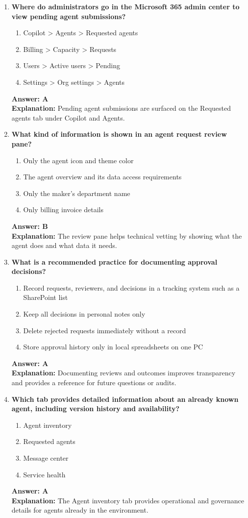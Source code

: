 \documentclass[10pt]{article}
\begin{document}
\begin{enumerate}[leftmargin=*]
\item \textbf{Where do administrators go in the Microsoft 365 admin center to view pending agent submissions?}
\begin{enumerate}[label=\Alph*.]
  \item Copilot > Agents > Requested agents
  \item Billing > Capacity > Requests
  \item Users > Active users > Pending
  \item Settings > Org settings > Agents
\end{enumerate}
\textbf{Answer: A}\\
\textbf{Explanation:} Pending agent submissions are surfaced on the Requested agents tab under Copilot and Agents.

\item \textbf{What kind of information is shown in an agent request review pane?}
\begin{enumerate}[label=\Alph*.]
  \item Only the agent icon and theme color
  \item The agent overview and its data access requirements
  \item Only the maker's department name
  \item Only billing invoice details
\end{enumerate}
\textbf{Answer: B}\\
\textbf{Explanation:} The review pane helps technical vetting by showing what the agent does and what data it needs.

\item \textbf{What is a recommended practice for documenting approval decisions?}
\begin{enumerate}[label=\Alph*.]
  \item Record requests, reviewers, and decisions in a tracking system such as a SharePoint list
  \item Keep all decisions in personal notes only
  \item Delete rejected requests immediately without a record
  \item Store approval history only in local spreadsheets on one PC
\end{enumerate}
\textbf{Answer: A}\\
\textbf{Explanation:} Documenting reviews and outcomes improves transparency and provides a reference for future questions or audits.

\item \textbf{Which tab provides detailed information about an already known agent, including version history and availability?}
\begin{enumerate}[label=\Alph*.]
  \item Agent inventory
  \item Requested agents
  \item Message center
  \item Service health
\end{enumerate}
\textbf{Answer: A}\\
\textbf{Explanation:} The Agent inventory tab provides operational and governance details for agents already in the environment.


\end{enumerate}
\end{document}
